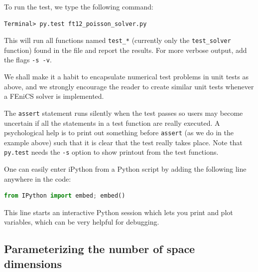 \documentclass[graybox,envcountchap,sectrefs,final]{svmonodo}
\newenvironment{notice_mdfboxadmon}[1][]{
\begin{notice_mdfboxmdframed}[frametitle=#1]
}
{
\end{notice_mdfboxmdframed}
}
\begin{document}
To run the test, we type the following command:

\begin{Verbatim}[frame=lines,label=\fbox{{\tiny Terminal}},framesep=2.5mm,framerule=0.7pt,fontsize=\fontsize{9pt}{9pt}]
Terminal> py.test ft12_poisson_solver.py
\end{Verbatim}
This will run all functions named \Verb!test_*! (currently only the
\Verb!test_solver! function) found in the file and report the results.
For more verbose output, add the flags \texttt{-s -v}.

We shall make it a habit to encapsulate numerical test problems in
unit tests as above, and we strongly encourage the reader to create
similar unit tests whenever a FEniCS solver is implemented.


\begin{notice_mdfboxadmon}
The \texttt{assert} statement runs silently when the test passes so users may
become uncertain if all the statements in a test function are really
executed. A psychological help is to print out something before \texttt{assert}
(as we do in the example above) such that it is clear that the
test really takes place.
Note that \texttt{py.test} needs the \texttt{-s} option to show printout
from the test functions.
\end{notice_mdfboxadmon} %




\begin{notice_mdfboxadmon}
One can easily enter iPython from a Python script by adding the following
line anywhere in the code:
\begin{lstlisting}[language=Python,style=graycolor]
from IPython import embed; embed()
\end{lstlisting}
This line starts an interactive Python session which lets you
print and plot variables, which can be very helpful for debugging.
\end{notice_mdfboxadmon} %



\subsection{Parameterizing the number of space dimensions}
\label{ch:poisson0:nD}

\end{document}
